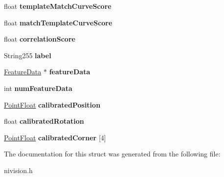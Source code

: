 \begin{DoxyCompactItemize}
\item 
\hypertarget{structGeometricPatternMatch2__struct_a71e61add974dcbc7cfad041828a15992}{float {\bfseries template\-Match\-Curve\-Score}}\label{structGeometricPatternMatch2__struct_a71e61add974dcbc7cfad041828a15992}

\item 
\hypertarget{structGeometricPatternMatch2__struct_ac0fecb6533a62b07ce5b3c9c61317c89}{float {\bfseries match\-Template\-Curve\-Score}}\label{structGeometricPatternMatch2__struct_ac0fecb6533a62b07ce5b3c9c61317c89}

\item 
\hypertarget{structGeometricPatternMatch2__struct_abd8544b12501d186ce30dc5d4dd6628c}{float {\bfseries correlation\-Score}}\label{structGeometricPatternMatch2__struct_abd8544b12501d186ce30dc5d4dd6628c}

\item 
\hypertarget{structGeometricPatternMatch2__struct_a9ee0ddccfc043e6ec109a44f70bd7b21}{\-String255 {\bfseries label}}\label{structGeometricPatternMatch2__struct_a9ee0ddccfc043e6ec109a44f70bd7b21}

\item 
\hypertarget{structGeometricPatternMatch2__struct_a3dcfd4d7732d40fd62af19e227eef5ed}{\hyperlink{structFeatureData__struct}{\-Feature\-Data} $\ast$ {\bfseries feature\-Data}}\label{structGeometricPatternMatch2__struct_a3dcfd4d7732d40fd62af19e227eef5ed}

\item 
\hypertarget{structGeometricPatternMatch2__struct_aaf7c1f584ade1ad566e0e20e83ef44d8}{int {\bfseries num\-Feature\-Data}}\label{structGeometricPatternMatch2__struct_aaf7c1f584ade1ad566e0e20e83ef44d8}

\item 
\hypertarget{structGeometricPatternMatch2__struct_af37b334c1b85be2e4b10f01eb6652f57}{\hyperlink{structPointFloat__struct}{\-Point\-Float} {\bfseries calibrated\-Position}}\label{structGeometricPatternMatch2__struct_af37b334c1b85be2e4b10f01eb6652f57}

\item 
\hypertarget{structGeometricPatternMatch2__struct_a1b53ac9ff1add7b5d653b8712b8c510b}{float {\bfseries calibrated\-Rotation}}\label{structGeometricPatternMatch2__struct_a1b53ac9ff1add7b5d653b8712b8c510b}

\item 
\hypertarget{structGeometricPatternMatch2__struct_aafb108f4173e57bb17060fde16640050}{\hyperlink{structPointFloat__struct}{\-Point\-Float} {\bfseries calibrated\-Corner} \mbox{[}4\mbox{]}}\label{structGeometricPatternMatch2__struct_aafb108f4173e57bb17060fde16640050}

\end{DoxyCompactItemize}


\-The documentation for this struct was generated from the following file\-:\begin{DoxyCompactItemize}
\item 
nivision.\-h\end{DoxyCompactItemize}
